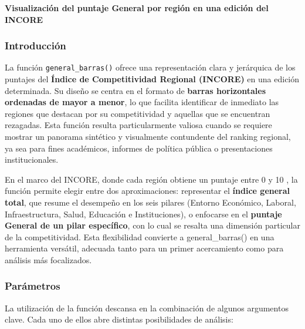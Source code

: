 \documentclass[
  11pt,
  letterpaper,
  DIV=11,
  numbers=noendperiod]{scrartcl}
\begin{document}
\textbf{Visualización del puntaje General por región en una edición del
INCORE}

\subsubsection{\texorpdfstring{\textbf{Introducción}}{Introducción}}\label{introducciuxf3n-2}

La función \texttt{general\_barras()} ofrece una representación clara y
jerárquica de los puntajes del \textbf{Índice de Competitividad Regional
(INCORE)} en una edición determinada. Su diseño se centra en el formato
de \textbf{barras horizontales ordenadas de mayor a menor}, lo que
facilita identificar de inmediato las regiones que destacan por su
competitividad y aquellas que se encuentran rezagadas. Esta función
resulta particularmente valiosa cuando se requiere mostrar un panorama
sintético y visualmente contundente del ranking regional, ya sea para
fines académicos, informes de política pública o presentaciones
institucionales.

En el marco del INCORE, donde cada región obtiene un puntaje entre 0 y
10 , la función permite elegir entre dos aproximaciones: representar el
\textbf{índice general total}, que resume el desempeño en los seis
pilares (Entorno Económico, Laboral, Infraestructura, Salud, Educación e
Instituciones), o enfocarse en el \textbf{puntaje General de un pilar
específico}, con lo cual se resalta una dimensión particular de la
competitividad. Esta flexibilidad convierte a general\_barras() en una
herramienta versátil, adecuada tanto para un primer acercamiento como
para análisis más focalizados.

\subsubsection{\texorpdfstring{\textbf{Parámetros}}{Parámetros}}\label{paruxe1metros-1}

La utilización de la función descansa en la combinación de algunos
argumentos clave. Cada uno de ellos abre distintas posibilidades de
análisis:
\end{document}
